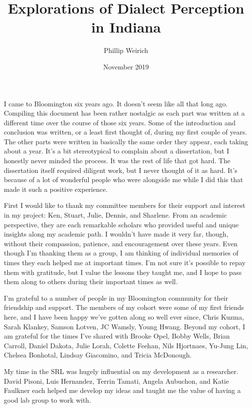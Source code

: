 \documentclass[showabstract,showacknowledgments,showdedication]{iuphd}
\title{Explorations of Dialect Perception in Indiana}
\author{Phillip Weirich}
\date{November 2019} %
\begin{document}
\maketitle
\acceptancepage




\begin{acknowledgments}


I came to Bloomington six years ago.
It doesn't seem like all that long ago.
Compiling this document has been rather nostalgic as each part was written at a different time over the course of those six years.
Some of the introduction and conclusion was written, or a least first thought of, during my first couple of years.
The other parts were written in basically the same order they appear, each taking about a year.
It's a bit stereotypical to complain about a dissertation, but I honestly never minded the process.
It was the rest of life that got hard.
The dissertation itself required diligent work, but I never thought of it as hard.
It's because of a lot of wonderful people who were alongside me while I did this that made it such a positive experience.

First I would like to thank my committee members for their support and interest in my project: Ken, Stuart, Julie, Dennis, and Sharlene.
From an academic perspective, they are each remarkable scholars who provided useful and unique insights along my academic path.
I wouldn't have made it very far, though, without their compassion, patience, and encouragement over these years.
Even though I'm thanking them as a group, I am thinking of individual memories of times they each helped me at important times.
I'm not sure it's possible to repay them with gratitude, but I value the lessons they taught me, and I hope to pass them along to others during their important times as well.

I'm grateful to a number of people in my Bloomington community for their friendship and support.
The members of my cohort were some of my first friends here, and I have been happy we've gotten along so well ever since, Chris Kuzma, Sarah Klankey, Samson Lotven, JC Wamsly, Young Hwang.
Beyond my cohort, I am grateful for the times I've shared with Brooke Opel, Bobby Wells, Brian Carroll, Daniel Dakota, Julie Lorah, Colette Feehan, Nils Hjortnaes, Yu-Jung Lin, Chelsea Bonhotal, Lindsay Giacomino, and Tricia McDonough.

My time in the SRL was hugely influential on my development as a researcher.
David Pisoni, Luis Hernandez, Terrin Tamati, Angela Aubuchon, and Katie Faulkner each helped me develop my ideas and taught me the value of having a good lab group to work with.


\end{acknowledgments}
\end{document}
